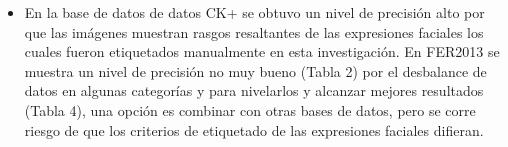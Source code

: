\begin{itemize}
\item En la base de datos de datos CK+ se obtuvo un nivel de precisión alto por que las
imágenes muestran rasgos resaltantes de las expresiones faciales los cuales fueron
etiquetados manualmente en esta investigación. En FER2013 se muestra un nivel
de precisión no muy bueno (Tabla 2) por el desbalance de datos en algunas
categorías y para nivelarlos y alcanzar mejores resultados (Tabla 4), una opción
es combinar con otras bases de datos, pero se corre riesgo de que los criterios de
etiquetado de las expresiones faciales difieran.


\end{itemize}